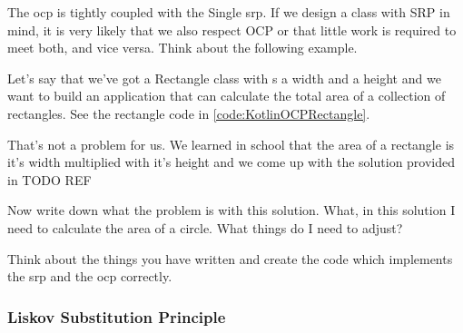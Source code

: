 The \gls{ocp} is tightly coupled with the Single \gls{srp}. If we design a class with SRP in mind, it is very likely that we also respect OCP or that little work is required to meet both, and vice versa. Think about the following example. 

Let’s say that we’ve got a Rectangle class with s a width and a height and we want to build an application that can calculate the total area of a collection of rectangles. See the rectangle code in \ref{code:KotlinOCPRectangle}.



That’s not a problem for us. We learned in school that the area of a rectangle is it’s width multiplied with it’s height and we come up with the solution provided in TODO REF




Now write down what the problem is with this solution. What, in this solution I need to calculate the area of a circle. What things do I need to adjust? 

\begin{exercise}
	Think about the things you have written and create the code which implements the \gls{srp} and the  \gls{ocp} correctly. 
\end{exercise}

\subsubsection{Liskov Substitution Principle}


